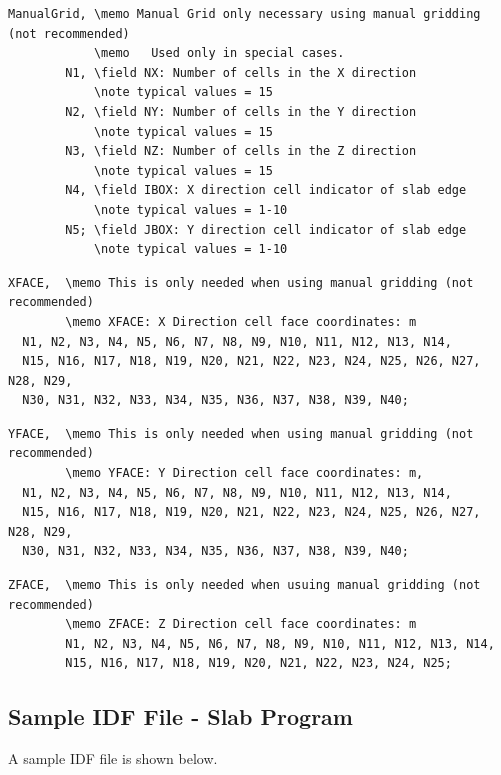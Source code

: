 \begin{lstlisting}
ManualGrid, \memo Manual Grid only necessary using manual gridding (not recommended)
            \memo   Used only in special cases.
        N1, \field NX: Number of cells in the X direction
            \note typical values = 15
        N2, \field NY: Number of cells in the Y direction
            \note typical values = 15
        N3, \field NZ: Number of cells in the Z direction
            \note typical values = 15
        N4, \field IBOX: X direction cell indicator of slab edge
            \note typical values = 1-10
        N5; \field JBOX: Y direction cell indicator of slab edge
            \note typical values = 1-10
\end{lstlisting}

\begin{lstlisting}
XFACE,  \memo This is only needed when using manual gridding (not recommended)
        \memo XFACE: X Direction cell face coordinates: m
  N1, N2, N3, N4, N5, N6, N7, N8, N9, N10, N11, N12, N13, N14,
  N15, N16, N17, N18, N19, N20, N21, N22, N23, N24, N25, N26, N27, N28, N29,
  N30, N31, N32, N33, N34, N35, N36, N37, N38, N39, N40;
\end{lstlisting}

\begin{lstlisting}
YFACE,  \memo This is only needed when using manual gridding (not recommended)
        \memo YFACE: Y Direction cell face coordinates: m,
  N1, N2, N3, N4, N5, N6, N7, N8, N9, N10, N11, N12, N13, N14,
  N15, N16, N17, N18, N19, N20, N21, N22, N23, N24, N25, N26, N27, N28, N29,
  N30, N31, N32, N33, N34, N35, N36, N37, N38, N39, N40;
\end{lstlisting}

\begin{lstlisting}
ZFACE,  \memo This is only needed when usuing manual gridding (not recommended)
        \memo ZFACE: Z Direction cell face coordinates: m
        N1, N2, N3, N4, N5, N6, N7, N8, N9, N10, N11, N12, N13, N14,
        N15, N16, N17, N18, N19, N20, N21, N22, N23, N24, N25;
\end{lstlisting}

\subsection{Sample IDF File - Slab Program}\label{sample-idf-file---slab-program}

A sample IDF file is shown below.

